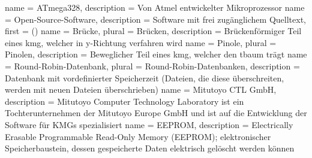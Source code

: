{
    name = {ATmega328},
    description = {Von Atmel entwickelter Mikroprozessor}
}
{
    name = {Open-Source-Software},
    description = {Software mit frei zugänglichem Quelltext},
    first = { ()}
}
{
    name = {Brücke},
    plural = {Brücken},
    description = {Brückenförmiger Teil eines \gls{kmg}, welcher in y-Richtung verfahren wird}
}
{
    name = {Pinole},
    plural = {Pinolen},
    description = {Beweglicher Teil eines \gls{kmg}, welcher den \gls{tbaum} trägt}
}
{
    name = {Round-Robin-Datenbank},
    plural = {Round-Robin-Datenbanken},
    description = {Datenbank mit vordefinierter Speicherzeit (Dateien, die diese überschreiten, werden mit neuen Dateien überschrieben)}
}
{
    name = {Mitutoyo CTL GmbH},
    description = {Mitutoyo Computer Technology Laboratory ist ein Tochterunternehmen der Mitutoyo Europe GmbH und ist auf die Entwicklung der Software für KMGs spezialisiert}
}
{
    name = {EEPROM},
    description = {Electrically Erasable Programmable Read-Only Memory (EEPROM); elektronischer Speicherbaustein, dessen gespeicherte Daten elektrisch gelöscht werden können}
}
\glsfindwidesttoplevelname